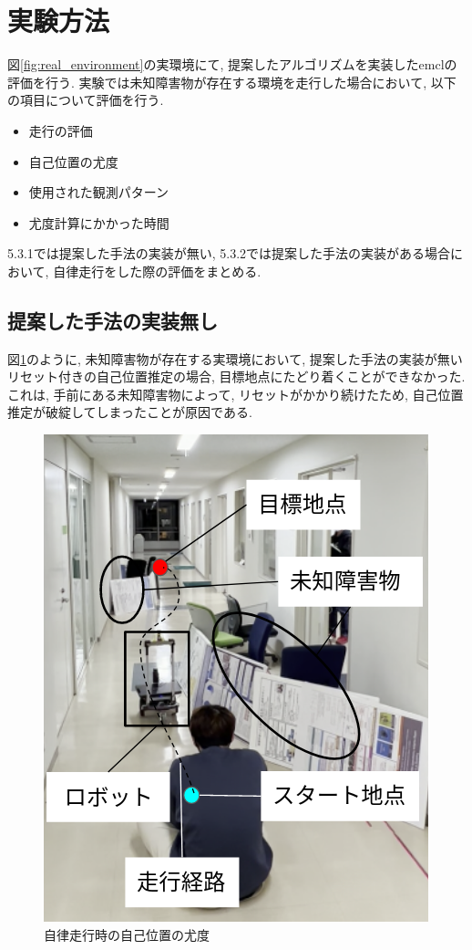 \section{実験方法}

図\ref{fig:real_environment}の実環境にて, 提案したアルゴリズムを実装したemclの評価を行う. 
実験では未知障害物が存在する環境を走行した場合において, 以下の項目について評価を行う. 
\begin{itemize}
  \item 走行の評価
  \item 自己位置の尤度
  \item 使用された観測パターン
  \item 尤度計算にかかった時間
\end{itemize}
5.3.1では提案した手法の実装が無い, 5.3.2では提案した手法の実装がある場合において, 
自律走行をした際の評価をまとめる. 

\subsection{提案した手法の実装無し}

図\ref{fig:nav_no_imp_real}のように, 未知障害物が存在する実環境において, 
提案した手法の実装が無いリセット付きの自己位置推定の場合, 
目標地点にたどり着くことができなかった. これは, 手前にある未知障害物によって, リセットがかかり続けたため, 
自己位置推定が破綻してしまったことが原因である. 

\begin{figure}[H]
  \begin{center}
    \includegraphics[width=0.5\linewidth]{figs/real_environment.png}
    \caption{自律走行時の自己位置の尤度}
    \label{fig:nav_no_imp_real}
  \end{center}
\end{figure}

